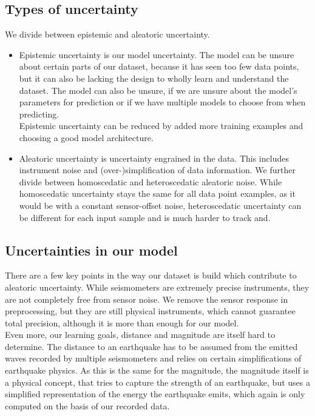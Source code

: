 \documentclass[thesis.tex]{subfiles}
\begin{document}
\subsection{Types of uncertainty}
We divide between epistemic and aleatoric uncertainty.
\begin{itemize}
	\item Epistemic uncertainty is our model uncertainty. The model can be unsure about certain parts of our dataset, because it has seen too few data points, but it can also be lacking the design to wholly learn and understand the dataset. The model can also be unsure, if we are unsure about the model's parameters for prediction or if we have multiple models to choose from when predicting. 
	\\
	Epistemic uncertainty can be reduced by added more training examples and choosing a good model architecture.
	\item Aleatoric uncertainty is uncertainty engrained in the data. This includes instrument noise and (over-)simplification of data information. We further divide between homoscedatic and heteroscedatic aleatoric noise. While homoscedatic uncertainty stays the same for all data point examples, as it would be with a constant sensor-offset noise, heteroscedatic uncertainty can be different for each input sample and is much harder to track and.
\end{itemize}
\subsection{Uncertainties in our model}
There are a few key points in the way our dataset is build which contribute to aleatoric uncertainty. While seismometers are extremely precise instruments, they are not completely free from sensor noise. We remove the sensor response in preprocessing, but they are still physical instruments, which cannot guarantee total precision, although it is more than enough for our model. 
\\
Even more, our learning goals, distance and magnitude are itself hard to determine. The distance to an earthquake has to be assumed from the emitted waves recorded by multiple seismometers and relies on certain simplifications of earthquake physics. As this is the same for the magnitude, the magnitude itself is a physical concept, that tries to capture the strength of an earthquake, but uses a simplified representation of the energy the earthquake emits, which again is only computed on the basis of our recorded data.
\end{document}
